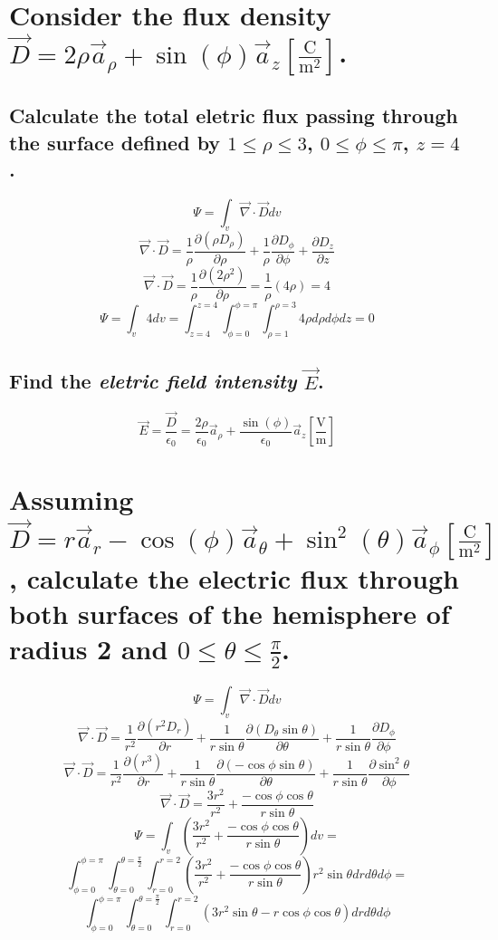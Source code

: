 \documentclass[14pt]{extarticle}
\begin{document}
\clearpage

\boldmath
\section{Consider the flux density $\vec{D}=2\rho\vec{a}_\rho+\sin(\phi)\vec{a}_z\left[\frac{\mathrm{C}}{\mathrm{m}^2}\right]$.}
\unboldmath{$ $}

\boldmath
\subsection{Calculate the total eletric flux passing through the surface defined by $1\le\rho\le3$, $0\le\phi\le \pi$, $z=4$.}
\unboldmath{$ $}

\[
	\Psi=\int_v\vec{\nabla}\cdot\vec{D}dv
\]
\[
	\vec{\nabla}\cdot\vec{D}=\frac{1}{\rho}\frac{\partial(\rho D_\rho)}{\partial\rho}+\frac{1}{\rho}\frac{\partial D_\phi}{\partial\phi}+\frac{\partial D_z}{\partial z}
\]
\[
	\vec{\nabla}\cdot\vec{D}=\frac{1}{\rho}\frac{\partial(2\rho^2)}{\partial\rho}=\frac{1}{\rho}(4\rho)=4
\]
\[
	\Psi=\int_v 4 dv=\int_{z=4}^{z=4}\int_{\phi=0}^{\phi=\pi}\int_{\rho=1}^{\rho=3}4\rho d\rho d\phi dz = 0
\]

\boldmath
\subsection{Find the \textit{eletric field intensity} $\vec{E}$.}
\unboldmath{$ $}

\[
	\vec{E}=\frac{\vec{D}}{\epsilon_0} = \frac{2\rho}{\epsilon_0}\vec{a}_\rho+\frac{\sin(\phi)}{\epsilon_0}\vec{a}_z\left[\frac{\mathrm{V}}{\mathrm{m}}\right]
\]

\clearpage

\boldmath
\section{Assuming $\vec{D}=r\vec{a}_r-\cos(\phi)\vec{a}_\theta+\sin^2(\theta)\vec{a}_\phi\left[\frac{\mathrm{C}}{\mathrm{m}^2}\right]$, \newline
  calculate the electric flux through both surfaces of the hemisphere of radius 2 and $0\le\theta\le\frac{\pi}{2}$.}
\unboldmath{$ $}

\[
	\Psi=\int_v\vec{\nabla}\cdot\vec{D}dv
\]
\[
	\vec{\nabla}\cdot\vec{D}=\frac{1}{r^2}\frac{\partial(r^2 D_r)}{\partial r}+\frac{1}{r\sin{\theta}}\frac{\partial (D_\theta\sin{\theta})}{\partial\theta}+\frac{1}{r\sin{\theta}}\frac{\partial D_\phi}{\partial\phi}
\]
\[
	\vec{\nabla}\cdot\vec{D}=\frac{1}{r^2}\frac{\partial(r^3)}{\partial r}+\frac{1}{r\sin{\theta}}\frac{\partial (-\cos{\phi}\sin{\theta})}{\partial\theta}+\frac{1}{r\sin{\theta}}\frac{\partial \sin^2{\theta}}{\partial\phi}
\]
\[
	\vec{\nabla}\cdot\vec{D}=\frac{3r^2}{r^2}+\frac{-\cos{\phi}\cos{\theta}}{r\sin{\theta}}
\]
\[
	\Psi=\int_v \left(\frac{3r^2}{r^2}+\frac{-\cos{\phi}\cos{\theta}}{r\sin{\theta}}\right)dv=
\]
\[
	\int_{\phi=0}^{\phi=\pi}\int_{\theta=0}^{\theta=\frac{\pi}{2}}\int_{r=0}^{r=2}\left(\frac{3r^2}{r^2}+\frac{-\cos{\phi}\cos{\theta}}{r\sin{\theta}}\right)r^2\sin{\theta}dr d\theta d\phi=
\]
\[
	\int_{\phi=0}^{\phi=\pi}\int_{\theta=0}^{\theta=\frac{\pi}{2}}\int_{r=0}^{r=2}\left(3r^2\sin\theta-r\cos{\phi}\cos{\theta}\right)dr d\theta d\phi
\]
\end{document}
